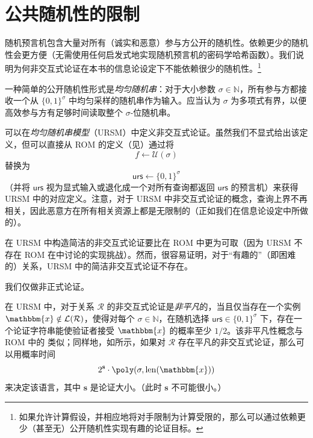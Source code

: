 \documentclass[american,singlepageview]{snargs-book-zh}
\newcommand{\Bits}{\{0,1\}}
\newcommand{\BitSize}[1]{\mathrm{len}(#1)}
\newcommand{\Naturals}{\mathbb{N}}
\newcommand{\Relation}{\mathcal{R}}
\newcommand{\Language}{\mathcal{L}}
\newcommand{\GetLanguage}[1]{\Language(#1)}
\newcommand{\Instance}{\mathbbm{x}}
\newcommand{\URS}{\mathsf{urs}}
\newcommand{\ARGComplexityFormat}[1]{\mathbf{#1}}
\newcommand{\ARGLength}{\ARGComplexityFormat{s}}
\newcommand{\ROFunction}{f}
\newcommand{\RODistribution}[1]{\mathcal{U}(#1)}
\newcommand{\ROOutputSize}{\sigma}
\begin{document}
\section{公共随机性的限制}
\label{section:ursm-limitation}

随机预言机包含大量对所有（诚实和恶意）参与方公开的随机性。依赖更少的随机性会更方便（无需使用任何启发式地实现随机预言机的密码学哈希函数）。我们说明为何非交互式论证在本书的信息论设定下不能依赖很少的随机性。\footnote{如果允许计算假设，并相应地将对手限制为计算受限的，那么可以通过依赖更少（甚至无）公开随机性实现有趣的论证目标。}

一种简单的公开随机性形式是\emph{均匀随机串}：对于大小参数 $\ROOutputSize\in\Naturals$，所有参与方都接收一个从 $\Bits^{\ROOutputSize}$ 中均匀采样的随机串作为输入。应当认为 $\ROOutputSize$ 为多项式有界，以便高效参与方有足够时间读取整个 $\ROOutputSize$-位随机串。

可以在\emph{均匀随机串模型}（URSM）中定义非交互式论证。虽然我们不显式给出该定义，但可以直接从 ROM 的定义（见）通过将
\[
  \ROFunction\gets\RODistribution{\ROOutputSize}
\]
替换为
\[
  \URS\gets\Bits^{\ROOutputSize}
\]
（并将 $\URS$ 视为显式输入或退化成一个对所有查询都返回 $\URS$ 的预言机）来获得 URSM 中的对应定义。注意，对于 URSM 中非交互式论证的概念，查询上界不再相关，因此恶意方在所有相关资源上都是无限制的（正如我们在信息论设定中所做的）。

在 URSM 中构造简洁的非交互式论证要比在 ROM 中更为可取（因为 URSM 不存在 ROM 在中讨论的实现挑战）。然而，很容易证明，对于“有趣的”（即困难的）关系，URSM 中的简洁非交互式论证不存在。

我们仅做非正式论证。

在 URSM 中，对于关系 $\Relation$ 的非交互式论证是\emph{非平凡}的，当且仅当存在一个实例 $\Instance\notin\GetLanguage{\Relation}$，使得对每个 $\ROOutputSize\in\Naturals$，在随机选择 $\URS\in\Bits^{\ROOutputSize}$ 下，存在一个论证字符串能使验证者接受 $\Instance$ 的概率至少 $1/2$。该非平凡性概念与 ROM 中的 类似；同样地，如所示，如果对 $\Relation$ 存在平凡的非交互式论证，那么可以用概率时间
\[
  2^{\ARGLength}\cdot\poly(\ROOutputSize,\BitSize{\Instance})
\]
来决定该语言，其中 $\ARGLength$ 是论证大小。（此时 $\ARGLength$ 不可能很小。）
\end{document}
